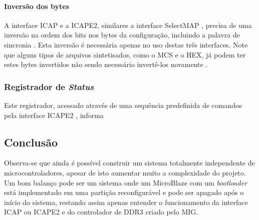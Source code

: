 \documentclass[11pt,a4paper,oneside]{book}
\begin{document}
\paragraph{Inversão dos bytes} A interface ICAP e a ICAPE2, similares a interface SelectMAP \cite{wp374}, precisa de uma inversão na ordem dos bits nos bytes da configuração, incluindo a palavra de sincronia \cite{xapp502}.
Esta inversão é necessária apenas no uso destas três interfaces.
Note que alguns tipos de arquivos sintetisados, como o MCS e o HEX, já podem ter estes bytes invertidos não sendo necessário invertê-los novamente \cite{ug470}.

\subsubsection{Registrador de \textit{Status}}
Este registrador, acessado através de uma sequência predefinida de comandos pela interface ICAPE2 \cite{ug470 - pp108}, informa 

\subsection{Conclusão}

Observa-se que ainda é possível construir um sistema totalmente independente de microcontroladores, apesar de isto aumentar muito a complexidade do projeto.
Um bom balanço pode ser um sistema onde um MicroBlaze com um \textit{bootloader} está implementado em uma partição reconfigurável e pode ser apagado após o início do sistema, restando assim apenas entender o funcionamento da interface ICAP ou ICAPE2 e do controlador de DDR3 criado pelo MIG.

\ifx\compilewholereport\undefined
	 
	\newsavebox\mytempbib\savebox\mytempbib{\parbox{\textwidth}{}}

	
\end{document}
